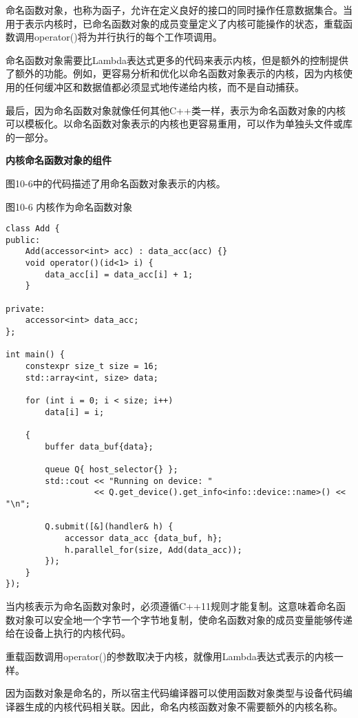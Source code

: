 命名函数对象，也称为函子，允许在定义良好的接口的同时操作任意数据集合。当用于表示内核时，已命名函数对象的成员变量定义了内核可能操作的状态，重载函数调用operator()将为并行执行的每个工作项调用。\par

命名函数对象需要比Lambda表达式更多的代码来表示内核，但是额外的控制提供了额外的功能。例如，更容易分析和优化以命名函数对象表示的内核，因为内核使用的任何缓冲区和数据值都必须显式地传递给内核，而不是自动捕获。\par

最后，因为命名函数对象就像任何其他C++类一样，表示为命名函数对象的内核可以模板化。以命名函数对象表示的内核也更容易重用，可以作为单独头文件或库的一部分。\par

\hspace*{\fill} \par %
\textbf{内核命名函数对象的组件}

图10-6中的代码描述了用命名函数对象表示的内核。\par

\hspace*{\fill} \par %
图10-6 内核作为命名函数对象
\begin{lstlisting}[caption={}]
class Add {
public:
	Add(accessor<int> acc) : data_acc(acc) {}
	void operator()(id<1> i) {
		data_acc[i] = data_acc[i] + 1;
	}

private:
	accessor<int> data_acc;
};

int main() {
	constexpr size_t size = 16;
	std::array<int, size> data;
	
	for (int i = 0; i < size; i++)
		data[i] = i;
		
	{
		buffer data_buf{data};
		
		queue Q{ host_selector{} };
		std::cout << "Running on device: "
				  << Q.get_device().get_info<info::device::name>() << "\n";
				  
		Q.submit([&](handler& h) {
			accessor data_acc {data_buf, h};
			h.parallel_for(size, Add(data_acc));
		});
	}
});
\end{lstlisting}

当内核表示为命名函数对象时，必须遵循C++11规则才能复制。这意味着命名函数对象可以安全地一个字节一个字节地复制，使命名函数对象的成员变量能够传递给在设备上执行的内核代码。\par

重载函数调用operator()的参数取决于内核，就像用Lambda表达式表示的内核一样。\par

因为函数对象是命名的，所以宿主代码编译器可以使用函数对象类型与设备代码编译器生成的内核代码相关联。因此，命名内核函数对象不需要额外的内核名称。\par













